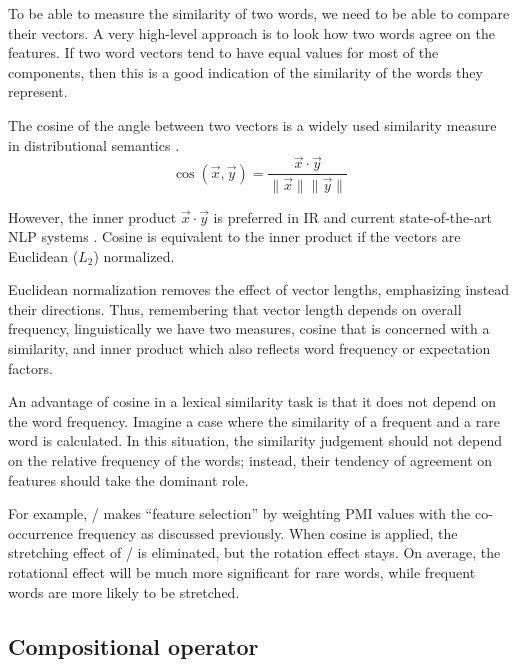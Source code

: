 To be able to measure the similarity of two words, we need to be able to compare their vectors. A very high-level approach is to look how two words agree on the features. If two word vectors tend to have equal values for most of the components, then this is a good indication of the similarity of the words they represent.

The cosine of the angle between two vectors is a widely used similarity measure in distributional semantics \cite{Turney:2010:FMV:1861751.1861756,lapesa2014large}.
%
\begin{equation*}
  \label{eq:cos}
  \cos(\vec{x}, \vec{y}) = \frac{\vec{x} \cdot \vec{y}}
                                {\|\vec{x}\| \|\vec{y}\|}
\end{equation*}

However, the inner product $\vec{x} \cdot \vec{y}$ is preferred in IR and current state-of-the-art NLP systems \cite{mikolov2013distributed,mikolov2013linguistic,TACL570}. Cosine is equivalent to the inner product if the vectors are Euclidean ($L_2$) normalized.

Euclidean normalization removes the effect of vector lengths, emphasizing instead their directions. Thus, remembering that vector length depends on overall frequency, linguistically we have two measures, cosine that is concerned with a similarity, and inner product which also reflects word frequency or expectation factors.

An advantage of cosine in a lexical similarity task is that it does not depend on the word frequency. Imagine a case where the similarity of a frequent and a rare word is calculated. In this situation, the similarity judgement should not depend on the relative frequency of the words; instead, their tendency of agreement on features should take the dominant role.

For example, \NPMI/ makes ``feature selection'' by weighting PMI values with the co-occurrence frequency as discussed previously. When cosine is applied, the stretching effect of \NPMI/ is eliminated, but the rotation effect stays. On average, the rotational effect will be much more significant for rare words, while frequent words are more likely to be stretched.

\subsection{Compositional operator}
\label{sec:comp-oper}





